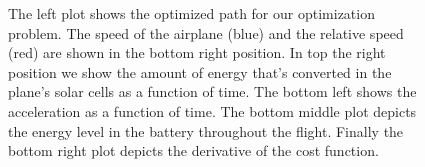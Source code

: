 \begin{figure}[width=15cm]
\begin{minipage}[c][11cm][t]{.5\textwidth}
  \label{fig:test32}
\end{minipage}
\caption{The left plot shows the optimized path for our optimization problem. The speed of the airplane (blue) and the relative speed (red) are shown in the bottom right position. In top the right position we show the amount of energy that's converted in the plane's solar cells as a function of time. The bottom left shows the acceleration as a function of time. The bottom middle plot depicts the energy level in the battery throughout the flight. Finally the bottom right plot depicts the derivative of the cost function.}
\label{fig:badPlot2}
\end{figure}

